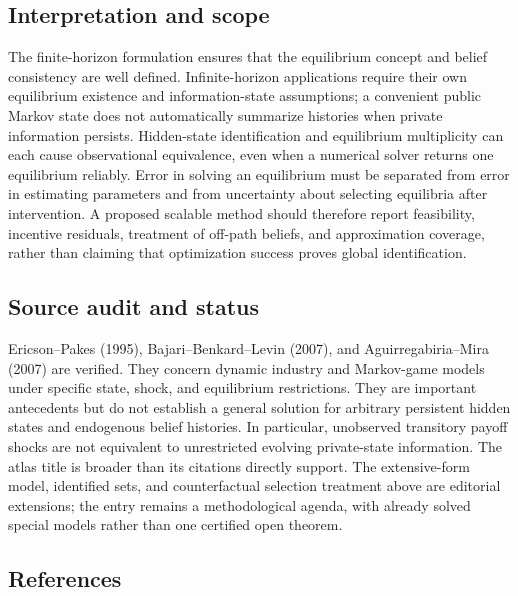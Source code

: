 \documentclass[11pt,a4paper]{article}
\begin{document}
\subsection*{Interpretation and scope}

The finite-horizon formulation ensures that the equilibrium concept and belief consistency are well defined. Infinite-horizon applications require their own equilibrium existence and information-state assumptions; a convenient public Markov state does not automatically summarize histories when private information persists. Hidden-state identification and equilibrium multiplicity can each cause observational equivalence, even when a numerical solver returns one equilibrium reliably. Error in solving an equilibrium must be separated from error in estimating parameters and from uncertainty about selecting equilibria after intervention. A proposed scalable method should therefore report feasibility, incentive residuals, treatment of off-path beliefs, and approximation coverage, rather than claiming that optimization success proves global identification.

\subsection*{Source audit and status}

Ericson--Pakes (1995), Bajari--Benkard--Levin (2007), and Aguirregabiria--Mira (2007) are verified. They concern dynamic industry and Markov-game models under specific state, shock, and equilibrium restrictions. They are important antecedents but do not establish a general solution for arbitrary persistent hidden states and endogenous belief histories. In particular, unobserved transitory payoff shocks are not equivalent to unrestricted evolving private-state information. The atlas title is broader than its citations directly support. The extensive-form model, identified sets, and counterfactual selection treatment above are editorial extensions; the entry remains a methodological agenda, with already solved special models rather than one certified open theorem.

\subsection*{References}
\end{document}
